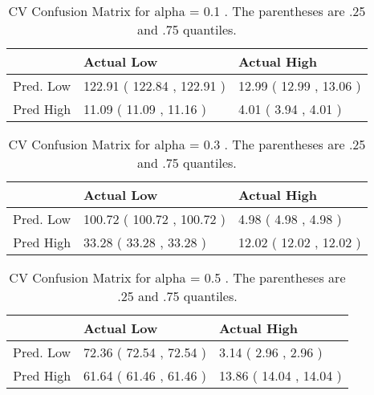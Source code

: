 \begin{table}[H]
\begin{center}
\begin{tabular}{rll}
  \hline
 & Actual Low & Actual High \\ 
  \hline
Pred. Low & 122.91 ( 122.84 , 122.91 ) & 12.99 ( 12.99 , 13.06 ) \\ 
  Pred High & 11.09 ( 11.09 , 11.16 ) & 4.01 ( 3.94 , 4.01 ) \\ 
   \hline
\end{tabular}
\caption{CV Confusion Matrix for alpha = 0.1 . The parentheses are .25 and .75 quantiles.}
\end{center}
\end{table}
\begin{table}[H]
\begin{center}
\begin{tabular}{rll}
  \hline
 & Actual Low & Actual High \\ 
  \hline
Pred. Low & 100.72 ( 100.72 , 100.72 ) & 4.98 ( 4.98 , 4.98 ) \\ 
  Pred High & 33.28 ( 33.28 , 33.28 ) & 12.02 ( 12.02 , 12.02 ) \\ 
   \hline
\end{tabular}
\caption{CV Confusion Matrix for alpha = 0.3 . The parentheses are .25 and .75 quantiles.}
\end{center}
\end{table}
\begin{table}[H]
\begin{center}
\begin{tabular}{rll}
  \hline
 & Actual Low & Actual High \\ 
  \hline
Pred. Low & 72.36 ( 72.54 , 72.54 ) & 3.14 ( 2.96 , 2.96 ) \\ 
  Pred High & 61.64 ( 61.46 , 61.46 ) & 13.86 ( 14.04 , 14.04 ) \\ 
   \hline
\end{tabular}
\caption{CV Confusion Matrix for alpha = 0.5 . The parentheses are .25 and .75 quantiles.}
\end{center}
\end{table}
